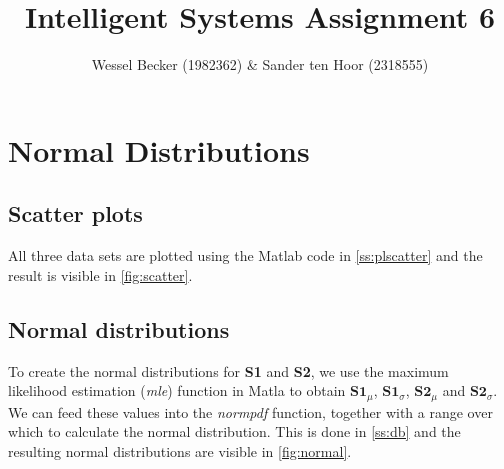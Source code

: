 \documentclass[10pt,a4paper]{article}
\begin{document}
\title{Intelligent Systems Assignment 6}
\author{Wessel Becker (1982362) \& Sander ten Hoor (2318555)}
\maketitle

\newcommand{\simplesubfigure}[3]{
  \noindent\begin{minipage}{.31\linewidth}
    \begin{center}
      \texttt{[image: \#1]}
      \captionof{figure}{#2}
      \label{#3}
    \end{center}
  \end{minipage}\hspace{7pt}
}
\newcommand{\simplefigure}[3]{
	\noindent\begin{figure}[H]
  	\centering
    	\makebox[.6\textwidth]
    	{
    		\texttt{[image: \#1]}
 		} \\
  		\caption{#2}
  		\label{#3}
	\end{figure}
}
\newcommand{\mcode}[2]{
	\label{#2}
}

\section{Normal Distributions}
\subsection{Scatter plots}
All three data sets are plotted using the Matlab code in \autoref{ss:plscatter} and the result is visible in \autoref{fig:scatter}.

\subsection{Normal distributions}
To create the normal distributions for \textbf{S1} and \textbf{S2}, we use the maximum likelihood estimation (\textit{mle}) function in Matla to obtain $\textbf{S1}_\mu$, $\textbf{S1}_\sigma$, $\textbf{S2}_\mu$ and $\textbf{S2}_\sigma$. We can feed these values into the \textit{normpdf} function, together with a range over which to calculate the normal distribution. This is done in \autoref{ss:db} and the resulting normal distributions are visible in \autoref{fig:normal}.
\end{document}
